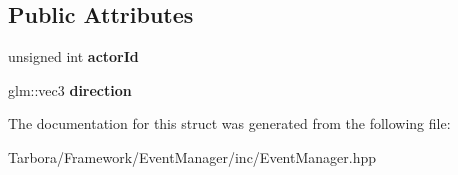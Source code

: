 \subsection*{Public Attributes}
\begin{DoxyCompactItemize}
\item 
\mbox{\label{structTarbora_1_1SetVelocityEvent_a439690fda1990c7810bb1b23f56cc0f6}} 
unsigned int {\bfseries actor\+Id}
\item 
\mbox{\label{structTarbora_1_1SetVelocityEvent_a8f9534d5125238f689ec5146feceb5a1}} 
glm\+::vec3 {\bfseries direction}
\end{DoxyCompactItemize}


The documentation for this struct was generated from the following file\+:\begin{DoxyCompactItemize}
\item 
Tarbora/\+Framework/\+Event\+Manager/inc/Event\+Manager.\+hpp\end{DoxyCompactItemize}
